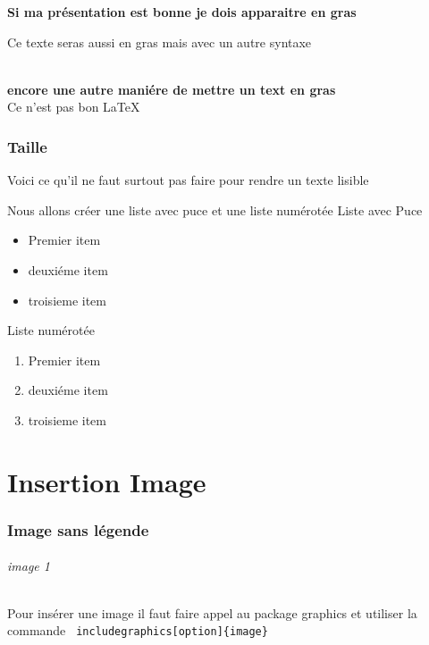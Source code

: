 \documentclass[a4paper,12pt]{book}
\begin{document}
	\textbf{Si ma présentation est bonne je dois apparaitre en gras}	\\
	
	\begin{bf}
		Ce texte seras aussi en gras mais avec un autre syntaxe 
	\end{bf} \\
	
	{\bf encore une autre maniére de mettre un text en gras} \\
	
	Ce n'est pas bon \LaTeX{} \\
	
	\section{Taille}
	
	\begin{tiny}
		{\normalsize Voici} ce qu'il ne faut {\Huge surtout} pas 
		faire {\Large pour {\footnotesize rendre} un texte 
		lisible}
	\end{tiny}
	
	\begin{section}
		Nous allons créer une liste avec puce et une liste numérotée 
		{\center Liste avec Puce}
		\begin{itemize} 
			\item Premier item 
			\item deuxiéme item
			\item troisieme item 
		\end{itemize}
				{\center Liste numérotée }
		\begin{enumerate} 
			\item Premier item 
			\item deuxiéme item
			\item troisieme item 
		\end{enumerate}
	\end{section}
	
	\part{Insertion Image}
		\section{Image sans légende}
		
		\paragraph{image 1}
		Pour insérer une image il faut faire appel au package graphics et utiliser la commande \verb? includegraphics[option]{image} ? \\ 
		
\end{document}
